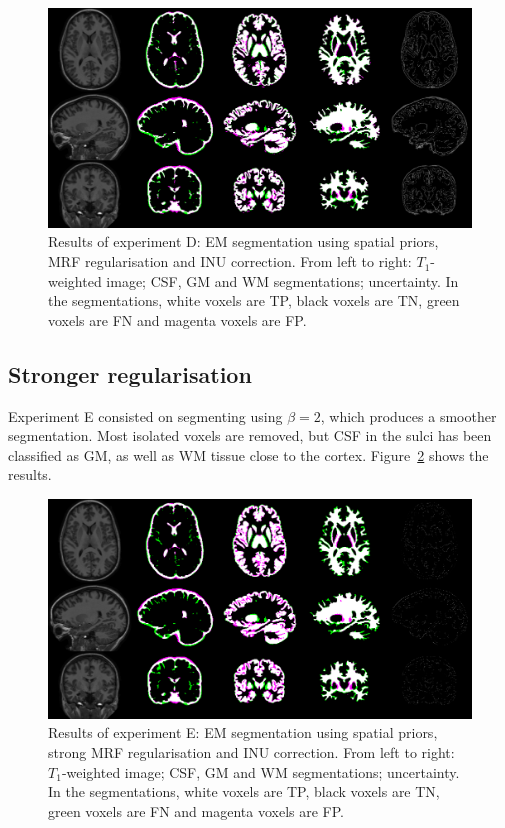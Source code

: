 \begin{figure}
  \centering
  \includegraphics[width=\textwidth]{figures/experiment_d}
  \caption{Results of experiment D: EM segmentation using spatial priors, MRF regularisation and INU correction. From left to right: $T_1$-weighted image; CSF, GM and WM segmentations; uncertainty. In the segmentations, white voxels are TP, black voxels are TN, green voxels are FN and magenta voxels are FP.}
  \label{fig:experiment-d}
\end{figure}


\subsection{Stronger regularisation}
Experiment E consisted on segmenting using $\beta = 2$, which produces a smoother segmentation. Most isolated voxels are removed, but CSF in the sulci has been classified as GM, as well as WM tissue close to the cortex. Figure~\ref{fig:experiment-e} shows the results.

\begin{figure}
  \centering
  \includegraphics[width=\textwidth]{figures/experiment_e}
  \caption{Results of experiment E: EM segmentation using spatial priors, strong MRF regularisation and INU correction. From left to right: $T_1$-weighted image; CSF, GM and WM segmentations; uncertainty. In the segmentations, white voxels are TP, black voxels are TN, green voxels are FN and magenta voxels are FP.}
  \label{fig:experiment-e}
\end{figure}



